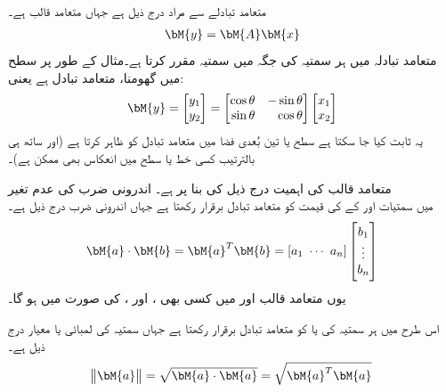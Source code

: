 متعامد تبادلے سے مراد درج ذیل ہے جہاں  متعامد قالب ہے۔
\begin{align}
\bM{y}=\bM{A}\bM{x}
\end{align}
 متعامد تبادلہ  میں ہر سمتیہ  کی جگہ  میں سمتیہ  مقرر کرتا ہے۔مثال کے طور پر سطح میں گھومنا، متعامد تبادل ہے یعنی:
\begin{align}\label{مساوات_امتیازی_سطحی_گردش}
\bM{y}=\begin{bmatrix} y_1\\y_2 \end{bmatrix}=\begin{bmatrix*}[r] \cos \theta&-\sin \theta\\ \sin \theta &\cos \theta \end{bmatrix*}\begin{bmatrix}x_1\\x_2  \end{bmatrix}
\end{align}
یہ ثابت کیا جا سکتا ہے سطح یا تین بُعدی فضا میں متعامد تبادل  کو ظاہر کرتا ہے (اور ساتھ ہی بالترتیب کسی خط یا سطح میں انعکاس بھی ممکن ہے)۔

متعامد قالب کی اہمیت درج ذیل کی بنا   پر ہے۔
\quad اندرونی ضرب کی عدم تغیر\\
 میں سمتیات  اور  کے  کی قیمت کو متعامد تبادل  برقرار رکھتا ہے جہاں اندرونی ضرب درج ذیل ہے۔
\begin{align}
\bM{a}\cdot \bM{b}=\bM{a}^T\bM{b}=[a_1\,\,\cdots\,\,a_n]\begin{bmatrix}b_1\\  \vdots \\ b_n  \end{bmatrix}
\end{align}
یوں  متعامد قالب  اور  میں کسی بھی  ،  اور ،  کی صورت میں  ہو گا۔

اس طرح   میں ہر سمتیہ  کی  یا  کو متعامد تبادل برقرار رکھتا ہے جہاں سمتیہ کی لمبائی یا معیار درج ذیل ہے۔
\begin{align}
\norm{\bM{a}}=\sqrt{\bM{a}\cdot \bM{a}}=\sqrt{\bM{a}^T\bM{a}}
\end{align}  

